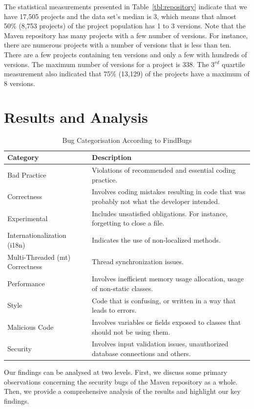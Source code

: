 \documentclass[conference]{llncs}
\begin{document}
The statistical measurements presented in Table~\ref{tbl:repository}
indicate that we have 17,505 projects and the data set's median
is 3, which means that almost 50\% (8,753 projects) of the project
population has 1 to 3 versions.
Note that the Maven repository has many projects with a
few number of versions. For instance, there are numerous projects with a
number of versions that is less than ten.
There are a few projects containing ten
versions and only a few with hundreds of versions. The maximum number of
versions for a project is 338. The 3$^{rd}$ quartile measurement
also indicated that 75\% (13,129) of the projects have a maximum of 8 versions.

\section{Results and Analysis}
\label{sec:res}

\begin{table}
\centering
\caption{Bug Categorisation According to FindBugs}
\label{tbl:bug-cat}
\begin{tabular}{l p{15em}}
\hline
Category & Description\\
\hline
Bad Practice & Violations of recommended and essential
coding practice. \\
Correctness & Involves coding mistakes resulting in code
that was probably not what the developer intended. \\
Experimental & Includes unsatisfied obligations. For instance,
forgetting to close a file. \\
Internationalization (i18n) & Indicates the use of non-localized methods. \\
Multi-Threaded ({\sc mt}) Correctness & Thread synchronization issues. \\
Performance & Involves inefficient memory usage allocation, usage 
of non-static classes. \\
Style & Code that is confusing, or
written in a way that leads to errors.\\
Malicious Code & Involves variables or fields exposed to classes that should
not be using them. \\
Security & Involves input validation issues, unauthorized database connections
and others. \\
\hline
\end{tabular}
\end{table}

Our findings can be analysed at two levels. First, we discuss some
primary observations concerning the security bugs of the Maven repository as a whole.
Then, we provide a comprehensive analysis of the results and highlight our key findings.
\end{document}
